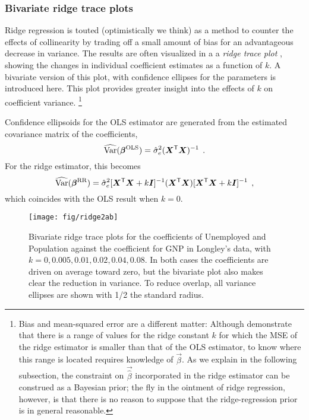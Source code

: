 \subsubsection{Bivariate ridge trace plots}\label{sec:ridge2}

Ridge regression is touted (optimistically we think) as a method to counter the effects
of collinearity by trading off a small amount of bias for an
advantageous decrease in variance.  The results are often
visualized in a a \emph{ridge trace plot}
\citep{HoerlKennard:1970b},
showing the changes
in individual coefficient estimates as a function of $k$.
A bivariate version of this plot, with confidence ellipses for
the parameters is introduced here.  This plot provides greater
insight into the effects of $k$ on coefficient variance.%
\footnote{Bias and mean-squared error are a different matter: Although \citet{HoerlKennard:1970a} demonstrate that there is a range of values for the ridge constant $k$ for which the MSE of the ridge estimator is smaller than that of the OLS estimator, to know where this range is located requires knowledge of $\vec{\beta}$. As we explain in the following subsection, the constraint on $\vec{\hat{\beta}}$ incorporated in the ridge estimator can be construed as a Bayesian prior; the fly in the ointment of ridge regression, however, is that there is no reason to suppose that the ridge-regression prior is in general reasonable.}

Confidence ellipsoids for the OLS estimator are generated
from the estimated covariance matrix of the coefficients,
\begin{equation*}
\widehat{\mathrm{Var}} (\bm{\beta}^{\mathrm{OLS}}) = \hat{\sigma}^2_e (\bm{X}^\mathsf{T} \bm{X})^{-1} \:\: .
\end{equation*}
For the ridge estimator, this becomes
\citep{Marquardt:1970}
\begin{equation}
\widehat{\mathrm{Var}} (\bm{\beta}^{\mathrm{RR}}) = \hat{\sigma}^2_e
    [\bm{X}^\mathsf{T} \bm{X} + k \bm{I}]^{-1}
    (\bm{X}^\mathsf{T} \bm{X})
    [\bm{X}^\mathsf{T} \bm{X} + k \bm{I}]^{-1} \:\: ,
\end{equation}
which coincides with the OLS result when $k=0$.
	
\begin{figure}[htb!]
  \centering
  \texttt{[image: fig/ridge2ab]}    %
  \caption{Bivariate ridge trace plots for the coefficients of Unemployed and Population
  	against the coefficient for GNP in Longley's data, with
  	$k = 0, 0.005, 0.01, 0.02, 0.04, 0.08$.
  	In both cases the coefficients are driven on average toward zero, but the bivariate
  	plot also makes clear the reduction in variance.
  	To reduce overlap, all variance ellipses are shown with 1/2 the standard radius.}%
  \label{fig:ridge2}
\end{figure}

